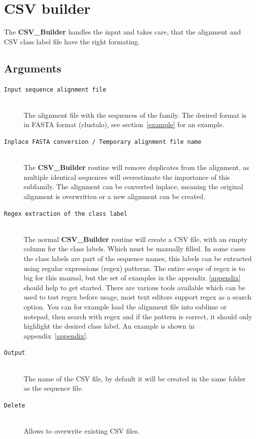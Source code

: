 \documentclass[a4paper,10pt]{article}
\begin{document}
\section{CSV builder} \label{csv_b}

The \textbf{CSV\_Builder} handles the input and takes care, 
that the alignment and CSV class label file have the right formating.

\subsection{Arguments}

\begin{description}

\item[\texttt{Input sequence alignment file}] \hfill \\
 
The alignment file with the sequences of the family.
The desired format is in FASTA format (clustalo), see section~\ref{example}
for an example.

\item[\texttt{Inplace FASTA conversion / Temporary alignment file name}] \hfill \\
 
The \textbf{CSV\_Builder} routine will remove duplicates from the 
alignment, as multiple identical sequences will overestimate the importance
of this subfamily. The alignment can be converted inplace, meaning
the original alignment is overwritten or a new alignment can be 
created.

\item[\texttt{Regex extraction of the class label}] \hfill \\
 
The normal \textbf{CSV\_Builder} routine will create a CSV file,
with an empty column for the class labels. Which must be manually 
filled.
In some cases the class labels are part of the sequence names,
this labels can be extracted using regular expressions (regex) patterns.
The entire scope of regex is to big for this manual, but the set of
examples in the appendix~\ref{appendix} should help to get started. There are various 
tools available which can be used to test regex before usage, most text editors 
support regex as a search option. You can 
for example load the alignment file into sublime or notepad, then
search with regex and if the pattern is correct, it should only highlight 
the desired class label. An example is shown in appendix~\ref{appendix}.

\item[\texttt{Output}] \hfill \\

The name of the CSV file, by default it will be created in the same folder as
the sequence file.

\item[\texttt{Delete}] \hfill \\

Allows to overwrite existing CSV files.

\end{description}
\end{document}
